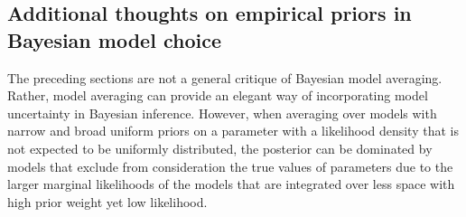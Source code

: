 \subsection{Additional thoughts on empirical priors in Bayesian model choice}
The preceding sections are not a general critique of Bayesian model averaging.
Rather, model averaging can provide an elegant way of incorporating
model uncertainty in Bayesian inference.
However, when averaging over models with narrow and broad uniform priors on a
parameter with a likelihood density that is not expected to be uniformly
distributed, the posterior can be dominated by models that exclude from
consideration the true values of parameters due to the larger marginal
likelihoods of the models that are integrated over less space with high prior
weight yet low likelihood.





